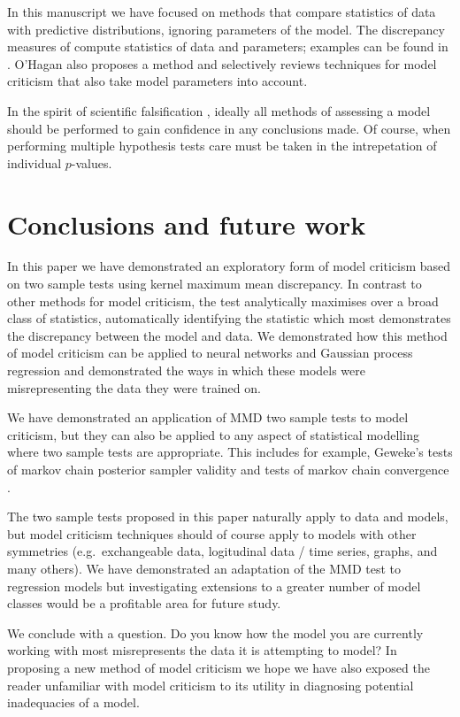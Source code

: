 \documentclass{article} %
\def\eg{e.g.\ }
\begin{document}
In this manuscript we have focused on methods that compare statistics of data with predictive distributions, ignoring parameters of the model.
The discrepancy measures of \cite{Gelman1996-ez} compute statistics of data and parameters; examples can be found in \cite{Gelman2013-st}.
O'Hagan \citep{OHagan2003-bc} also proposes a method and selectively reviews techniques for model criticism that also take model parameters into account.

In the spirit of scientific falsification \citep[e.g.][]{Popper2005-qq}, ideally all methods of assessing a model should be performed to gain confidence in any conclusions made.
Of course, when performing multiple hypothesis tests care must be taken in the intrepetation of individual $p$-values.

\section{Conclusions and future work}

In this paper we have demonstrated an exploratory form of model criticism based on two sample tests using kernel maximum mean discrepancy.
In contrast to other methods for model criticism, the test analytically maximises over a broad class of statistics, automatically identifying the statistic which most demonstrates the discrepancy between the model and data.
We demonstrated how this method of model criticism can be applied to neural networks and Gaussian process regression and demonstrated the ways in which these models were misrepresenting the data they were trained on.

We have demonstrated an application of MMD two sample tests to model criticism, but they can also be applied to any aspect of statistical modelling where two sample tests are appropriate.
This includes for example, Geweke's tests of markov chain posterior sampler validity \citep{Geweke2004-yx} and tests of markov chain convergence \citep[e.g.][]{Cowles1996-qy}.

The two sample tests proposed in this paper naturally apply to \iid data and models, but model criticism techniques should of course apply to models with other symmetries (\eg exchangeable data, logitudinal data / time series, graphs, and many others).
We have demonstrated an adaptation of the MMD test to regression models but investigating extensions to a greater number of model classes would be a profitable area for future study.

We conclude with a question.
Do you know how the model you are currently working with most misrepresents the data it is attempting to model?
In proposing a new method of model criticism we hope we have also exposed the reader unfamiliar with model criticism to its utility in diagnosing potential inadequacies of a model.


\small



\end{document}
